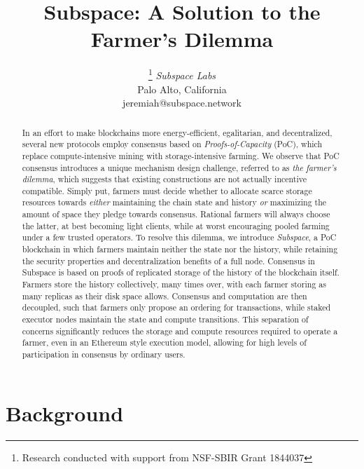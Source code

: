 \documentclass[conference]{IEEEtran}
\begin{document}
\title{Subspace: A Solution to the Farmer's Dilemma}

\author{
\thanks{Research conducted with support from NSF-SBIR Grant 1844037}
\textit{Subspace Labs}\\
Palo Alto, California \\
jeremiah@subspace.network
}

\maketitle

\begin{abstract}
In an effort to make blockchains more energy-efficient, egalitarian, and decentralized, several new protocols employ consensus based on \textit{Proofs-of-Capacity} (PoC), which replace compute-intensive mining with storage-intensive farming. We observe that PoC consensus introduces a unique mechanism design challenge, referred to as \textit{the farmer’s dilemma}, which suggests that existing constructions are not actually incentive compatible. Simply put, farmers must decide whether to allocate scarce storage resources towards \textit{either} maintaining the chain state and history \textit{or} maximizing the amount of space they pledge towards consensus. Rational farmers will always choose the latter, at best becoming light clients, while at worst encouraging pooled farming under a few trusted operators. To resolve this dilemma, we introduce \textit{Subspace}, a PoC blockchain in which farmers maintain neither the state nor the history, while retaining the security properties and decentralization benefits of a full node. Consensus in Subspace is based on proofs of replicated storage of the history of the blockchain itself. Farmers store the history collectively, many times over, with each farmer storing as many replicas as their disk space allows. Consensus and computation are then decoupled, such that farmers only propose an ordering for transactions, while staked executor nodes maintain the state and compute transitions. This separation of concerns significantly reduces the storage and compute resources required to operate a farmer, even in an Ethereum style execution model, allowing for high levels of participation in consensus by ordinary users.

\end{abstract}

\section{Background}
\end{document}

